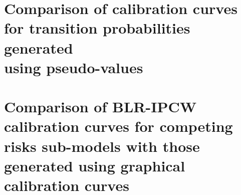 \documentclass[nojss]{jss}
\begin{document}
\begin{appendix}

\section[Comparison of calibration curves for transition probabilities generated using pseudo-values]{\texorpdfstring{Comparison of calibration curves for transition probabilities generated\\ using pseudo-values}{Comparison of calibration curves for transition probabilities generated using pseudo-values}} \label{app:pseudo}

\section[Comparison of BLR-IPCW calibration curves for competing risks sub-models with those generated using graphical calibration curves]{\texorpdfstring{Comparison of BLR-IPCW calibration curves for competing risks sub-models with those generated using graphical calibration curves}{Comparison of BLR-IPCW calibration curves for competing risks\\ sub-models with those generated using graphical calibration curves}} \label{app:gcc}


\end{appendix}
\end{document}
